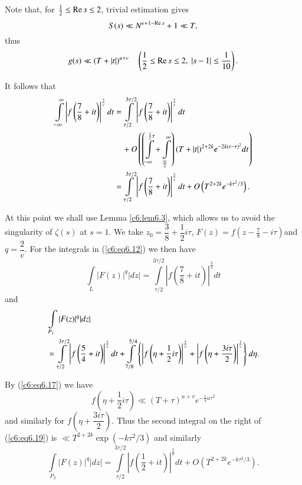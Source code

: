 Note that, for $\frac{1}{2} \leq \operatorname{Re} s \leq 2$, trivial estimation gives
$$
S(s) \ll N^{\epsilon + 1 - \operatorname{Re} s} + 1 \ll T,
$$
thus
\begin{equation}
g(s) \ll (T + |t|)^{u+v}  \quad \left(\frac{1}{2} \leq \operatorname{Re} s \leq 2,
\; |s-1| \leq \frac{1}{10} \right).\label{c6:eq6.17} 
\end{equation}

It follows that
\begin{align}
\int\limits^\infty_{-\infty} \left|f \left(\frac{7}{8} + it
\right)\right|^{\frac{2}{v}} dt & = \int\limits^{3\tau/2}_{\tau/2} 
\left|f\left(\frac{7}{8} + it \right)\right|^{\frac{2}{v}} dt\notag\\  
& \quad +  O \left( \left(\int\limits^{\frac{1}{2} \tau}_{-\infty} +
\int\limits^\infty_{\frac{3\tau}{2}} \right) (T +|t|)^{2+2k} e^{-2k
  (t-\tau)^2} dt\right)\notag\\ 
& = \int\limits^{3\tau/2}_{\tau/2} \left|f \left(\frac{7}{8} + it
\right)\right|^{\frac{2}{v}} dt + O \left(T^{2+2k}
e^{-k\tau^2/3}\right). \label{c6:eq6.18} 
\end{align}

At this point we shall use Lemma \ref{c6:lem6.3}, which allows us to
avoid the singularity of $\zeta(s)$ at $s=1$. We take $z_0 =
\dfrac{3}{8} + \dfrac{1}{2} i\tau$, $F(z) = f\left(z - \frac{7}{8} -
i\tau \right)$\pageoriginale and $q =\dfrac{2}{v}$. For the integrals
in (\ref{c6:eq6.12}) we then have  
$$
\int\limits_L |F(z)|^q |dz| = \int\limits^{3\tau/2}_{\tau/2} \left|f 
\left(\frac{7}{8} + it \right)\right|^{\frac{2}{v}} dt 
$$
and 
\begin{align}
& \int\limits_{P_1} |F(z)|^q |dz|\label{c6:eq6.19}\\
& = \int\limits^{3\tau/2}_{\tau/2} \left|f \left(\frac{5}{4} + it
  \right)\right|^{\frac{2}{v}} dt + \int\limits^{5/4}_{7/8} \left\{
  \left|f \left(\eta + \frac{1}{2} i \tau \right)\right|^{\frac{2}{v}}
  + \left|f  \left(\eta + \frac{3 i \tau}{2}
  \right)\right|^{\frac{2}{v}}\right\} d\eta. \notag 
\end{align}

By (\ref{c6:eq6.17}) we have
$$
f\left(\eta + \frac{1}{2} i \tau \right) \ll (T + \tau)^{u+v}
e^{-\frac{1}{4} u\tau^2} 
$$
and similarly for $f\left(\eta+ \dfrac{3 i \tau}{2} \right)$. Thus the
second integral on the right of (\ref{c6:eq6.19}) is $\ll T^{2 + 2k}
\exp (-k\tau^2/3) $ and similarly 
$$
\int\limits_{P_2} |F(z)|^q |dz| = \int\limits^{3 \tau/2}_{\tau/2}
\left|f \left(\frac{1}{2} + it \right)\right|^{\frac{2}{v}} dt + O
\left(T^{2+2k} e^{-k \tau^2/3}\right).  
$$

